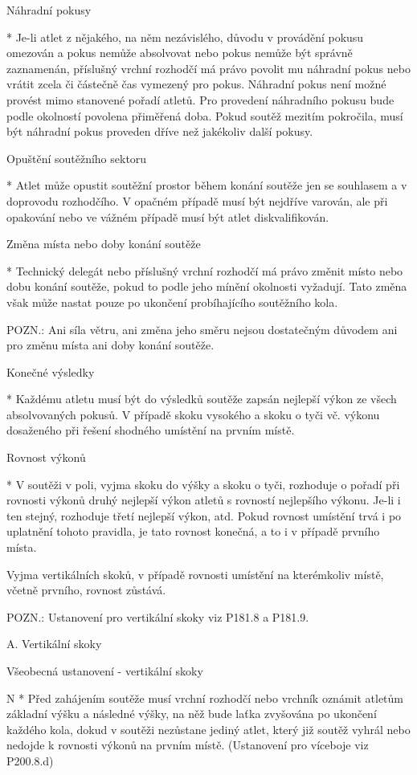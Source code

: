 Náhradní pokusy

* Je-li atlet z nějakého, na něm nezávislého, důvodu v provádění pokusu omezován a pokus nemůže absolvovat nebo pokus nemůže být správně zaznamenán, příslušný vrchní rozhodčí má právo povolit mu náhradní pokus nebo vrátit zcela či částečně čas vymezený pro pokus. Náhradní pokus není možné provést mimo stanovené pořadí atletů. Pro provedení náhradního pokusu bude podle okolností povolena přiměřená doba. Pokud soutěž mezitím pokročila, musí být náhradní pokus proveden dříve než jakékoliv další pokusy.

Opuštění soutěžního sektoru

* Atlet může opustit soutěžní prostor během konání soutěže jen se souhlasem a v doprovodu rozhodčího. V opačném případě musí být nejdříve varován, ale při opakování nebo ve vážném případě musí být atlet diskvalifikován.

Změna místa nebo doby konání soutěže

* Technický delegát nebo příslušný vrchní rozhodčí má právo změnit místo nebo dobu konání soutěže, pokud to podle jeho mínění okolnosti vyžadují. Tato změna však může nastat pouze po ukončení probíhajícího soutěžního kola.

POZN.: Ani síla větru, ani změna jeho směru nejsou dostatečným důvodem ani pro změnu místa ani doby konání soutěže.

Konečné výsledky

* Každému atletu musí být do výsledků soutěže zapsán nejlepší výkon ze všech absolvovaných pokusů. V případě skoku vysokého a skoku o tyči vč. výkonu dosaženého při řešení shodného umístění na prvním místě.

Rovnost výkonů

* V soutěži v poli, vyjma skoku do výšky a skoku o tyči, rozhoduje o pořadí při rovnosti výkonů druhý nejlepší výkon atletů s rovností nejlepšího výkonu. Je-li i ten stejný, rozhoduje třetí nejlepší výkon, atd. Pokud rovnost umístění trvá i po uplatnění tohoto pravidla, je tato rovnost konečná, a to i v případě prvního místa.

Vyjma vertikálních skoků, v případě rovnosti umístění na kterémkoliv místě, včetně prvního, rovnost zůstává.

POZN.: Ustanovení pro vertikální skoky viz P181.8 a P181.9.
\enditems


A. Vertikální skoky

\secc Všeobecná ustanovení - vertikální skoky

\begitems \style N
* Před zahájením soutěže musí vrchní rozhodčí nebo vrchník oznámit atletům základní výšku a následné výšky, na něž bude laťka zvyšována po ukončení každého kola, dokud v soutěži nezůstane jediný atlet, který již soutěž vyhrál nebo nedojde k rovnosti výkonů na prvním místě. (Ustanovení pro víceboje viz P200.8.d)

